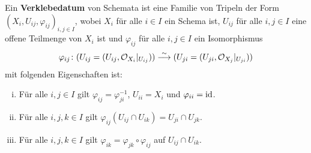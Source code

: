 \begin{defn}
\label{defn:5.9}
	Ein \textbf{Verklebedatum} von Schemata ist eine Familie von Tripeln der Form $(X_i,U_{ij},\varphi_{ij})_{i,j\in I}$, wobei $X_i$ für alle $i \in I$ ein Schema ist, $U_{ij}$ für alle $i,j \in I$ eine offene Teilmenge von $X_i$ ist und $\varphi_{ij}$ für alle $i,j \in I$ ein Isomorphismus
	\[
		\varphi_{ij} \colon (U_{ij}=(U_{ij},\mathcal{O}_{X_i}\vert_{U_{ij}})) \overset{\sim}{\longrightarrow} (U_{ji}=(U_{ji},\mathcal{O}_{X_j}\vert_{U_{ji}}))
	\]
	mit folgenden Eigenschaften ist:
	\begin{enumerate}[i)]
		\item Für alle $i,j \in I$ gilt $\varphi_{ij} = \varphi^{-1}_{ji}$, $U_{ii} = X_i$ und $\varphi_{ii}= \operatorname{id}$.
		\item Für alle $i,j,k \in I$ gilt $\varphi_{ij}(U_{ij}\cap U_{ik}) = U_{ji} \cap U_{jk}$.
		\item Für alle $i,j,k \in I$ gilt $\varphi_{ik} = \varphi_{jk}\circ \varphi_{ij}$ auf $U_{ij} \cap U_{ik}$.
	\end{enumerate}
\end{defn}

